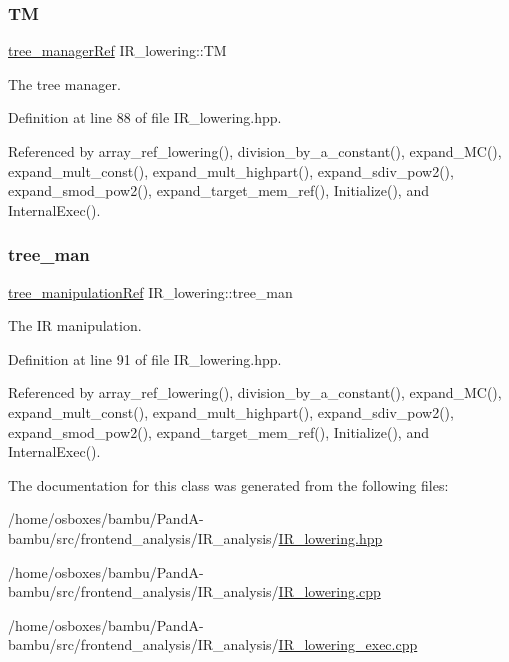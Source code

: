 \subsubsection{\texorpdfstring{TM}{TM}}
{\footnotesize\ttfamily \hyperlink{tree__manager_8hpp_a96ff150c071ce11a9a7a1e40590f205e}{tree\+\_\+manager\+Ref} I\+R\+\_\+lowering\+::\+TM\hspace{0.3cm}{\ttfamily [private]}}



The tree manager. 



Definition at line 88 of file I\+R\+\_\+lowering.\+hpp.



Referenced by array\+\_\+ref\+\_\+lowering(), division\+\_\+by\+\_\+a\+\_\+constant(), expand\+\_\+\+M\+C(), expand\+\_\+mult\+\_\+const(), expand\+\_\+mult\+\_\+highpart(), expand\+\_\+sdiv\+\_\+pow2(), expand\+\_\+smod\+\_\+pow2(), expand\+\_\+target\+\_\+mem\+\_\+ref(), Initialize(), and Internal\+Exec().

\mbox{\label{classIR__lowering_add46902d334d46da094f417dd5cd4ba8}} 
\subsubsection{\texorpdfstring{tree\+\_\+man}{tree\_man}}
{\footnotesize\ttfamily \hyperlink{tree__manipulation_8hpp_a1a9460e3a2f9fc6a96cfd2f24cc9b2a5}{tree\+\_\+manipulation\+Ref} I\+R\+\_\+lowering\+::tree\+\_\+man\hspace{0.3cm}{\ttfamily [private]}}



The IR manipulation. 



Definition at line 91 of file I\+R\+\_\+lowering.\+hpp.



Referenced by array\+\_\+ref\+\_\+lowering(), division\+\_\+by\+\_\+a\+\_\+constant(), expand\+\_\+\+M\+C(), expand\+\_\+mult\+\_\+const(), expand\+\_\+mult\+\_\+highpart(), expand\+\_\+sdiv\+\_\+pow2(), expand\+\_\+smod\+\_\+pow2(), expand\+\_\+target\+\_\+mem\+\_\+ref(), Initialize(), and Internal\+Exec().



The documentation for this class was generated from the following files\+:\begin{DoxyCompactItemize}
\item 
/home/osboxes/bambu/\+Pand\+A-\/bambu/src/frontend\+\_\+analysis/\+I\+R\+\_\+analysis/\hyperlink{IR__lowering_8hpp}{I\+R\+\_\+lowering.\+hpp}\item 
/home/osboxes/bambu/\+Pand\+A-\/bambu/src/frontend\+\_\+analysis/\+I\+R\+\_\+analysis/\hyperlink{IR__lowering_8cpp}{I\+R\+\_\+lowering.\+cpp}\item 
/home/osboxes/bambu/\+Pand\+A-\/bambu/src/frontend\+\_\+analysis/\+I\+R\+\_\+analysis/\hyperlink{IR__lowering__exec_8cpp}{I\+R\+\_\+lowering\+\_\+exec.\+cpp}\end{DoxyCompactItemize}
